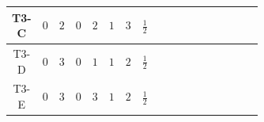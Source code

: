 \documentclass[8pt]{article}
\begin{document}
\begin{landscape}
\begin{longtable}{@{}cccccccc >{\raggedright\arraybackslash}p{0.21\linewidth} >{\raggedright\arraybackslash}p{0.21\linewidth} >{\raggedright\arraybackslash}p{0.21\linewidth}@{}}
T3-C & $0$ & $2$ & $0$ & $2$ & $1$ & $3$ & $\frac{1}{2}$ & \scriptsize\adjustbox{max width=\linewidth}{$\begin{gathered} -\frac{1}{6} \hbar  \log \left(\frac{\bar{\mu}^{2}}{M_{S_2}^2}\right) B_{\mu _1\mu _2}^2\end{gathered}$} & \scriptsize\adjustbox{max width=\linewidth}{$\begin{gathered} -\frac{1}{24} \hbar  \log \left(\frac{\bar{\mu}^{2}}{M_{S_2}^2}\right) \left(W_{\mu _1\mu _2}^{A_1}\right){}^2\end{gathered}$} & \scriptsize\adjustbox{max width=\linewidth}{$\begin{gathered} -\frac{3}{4} \hbar  \log \left(\frac{\bar{\mu}^{2}}{M_F^2}\right) B_{\mu _1\mu _2}^2\end{gathered}$} \\
\midrule
T3-D & $0$ & $3$ & $0$ & $1$ & $1$ & $2$ & $\frac{1}{2}$ & \scriptsize\adjustbox{max width=\linewidth}{$\begin{gathered} -\frac{1}{12} \hbar  \log \left(\frac{\bar{\mu}^{2}}{M_{S_2}^2}\right) B_{\mu _1\mu _2}^2\end{gathered}$} &  & \scriptsize\adjustbox{max width=\linewidth}{$\begin{gathered} -\frac{1}{2} \hbar  \log \left(\frac{\bar{\mu}^{2}}{M_F^2}\right) B_{\mu _1\mu _2}^2\end{gathered}$} \\
\midrule
T3-E & $0$ & $3$ & $0$ & $3$ & $1$ & $2$ & $\frac{1}{2}$ & \scriptsize\adjustbox{max width=\linewidth}{$\begin{gathered} -\frac{1}{4} \hbar  \log \left(\frac{\bar{\mu}^{2}}{M_{S_2}^2}\right) B_{\mu _1\mu _2}^2\end{gathered}$} & \scriptsize\adjustbox{max width=\linewidth}{$\begin{gathered} -\frac{1}{6} \hbar  \log \left(\frac{\bar{\mu}^{2}}{M_{S_2}^2}\right) \left(W_{\mu _1\mu _2}^{A_1}\right){}^2\end{gathered}$} & \scriptsize\adjustbox{max width=\linewidth}{$\begin{gathered} -\frac{1}{2} \hbar  \log \left(\frac{\bar{\mu}^{2}}{M_F^2}\right) B_{\mu _1\mu _2}^2\end{gathered}$} \\
\midrule
\bottomrule
\end{longtable}
\clearpage

\end{landscape}
\end{document}
